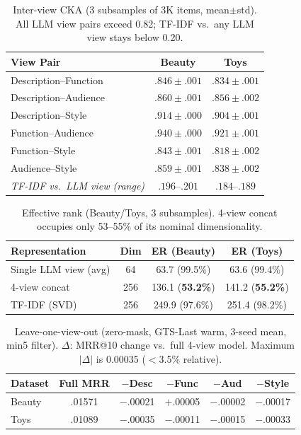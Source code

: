 \documentclass[sigconf,natbib=true,anonymous]{acmart}
\begin{document}
\begin{table}[t]
\centering
\caption{%
Inter-view CKA (3 subsamples of 3K items, mean$\pm$std).
All LLM view pairs exceed 0.82; TF-IDF vs.\ any LLM view stays below 0.20.%
}
\label{tab:cka}
\small
\setlength{\tabcolsep}{4pt}
\begin{tabular}{@{}lcc@{}}
\toprule
View Pair & Beauty & Toys \\
\midrule
Description--Function  & $.846 \pm .001$ & $.834 \pm .001$ \\
Description--Audience  & $.860 \pm .001$ & $.856 \pm .002$ \\
Description--Style     & $.914 \pm .000$ & $.904 \pm .001$ \\
Function--Audience     & $.940 \pm .000$ & $.921 \pm .001$ \\
Function--Style        & $.843 \pm .001$ & $.818 \pm .002$ \\
Audience--Style        & $.859 \pm .001$ & $.838 \pm .002$ \\
\midrule
\emph{TF-IDF vs.\ LLM view (range)} & $.196$--$.201$ & $.184$--$.189$ \\
\bottomrule
\end{tabular}
\end{table}

\begin{table}[t]
\centering
\caption{%
Effective rank (Beauty/Toys, 3 subsamples).
4-view concat occupies only 53--55\% of its nominal dimensionality.%
}
\label{tab:effrank}
\small
\begin{tabular}{@{}lccc@{}}
\toprule
Representation & Dim & ER (Beauty) & ER (Toys) \\
\midrule
Single LLM view (avg) & 64 & 63.7 (99.5\%) & 63.6 (99.4\%) \\
4-view concat & 256 & 136.1 (\textbf{53.2\%}) & 141.2 (\textbf{55.2\%}) \\
TF-IDF (SVD) & 256 & 249.9 (97.6\%) & 251.4 (98.2\%) \\
\bottomrule
\end{tabular}
\end{table}

\begin{table}[t]
\centering
\caption{%
Leave-one-view-out (zero-mask, GTS-Last warm, 3-seed mean, min5 filter).
$\Delta$: MRR@10 change vs.\ full 4-view model.
Maximum $|\Delta|$ is 0.00035 ($<$3.5\% relative).%
}
\label{tab:loov}
\small
\setlength{\tabcolsep}{3.5pt}
\begin{tabular}{@{}lccccc@{}}
\toprule
Dataset & Full MRR & $-$Desc & $-$Func & $-$Aud & $-$Style \\
\midrule
Beauty & .01571 & $-$.00021 & $+$.00005 & $-$.00002 & $-$.00017 \\
Toys   & .01089 & $-$.00035 & $-$.00011 & $-$.00015 & $-$.00033 \\
\bottomrule
\end{tabular}
\end{table}
\end{document}
